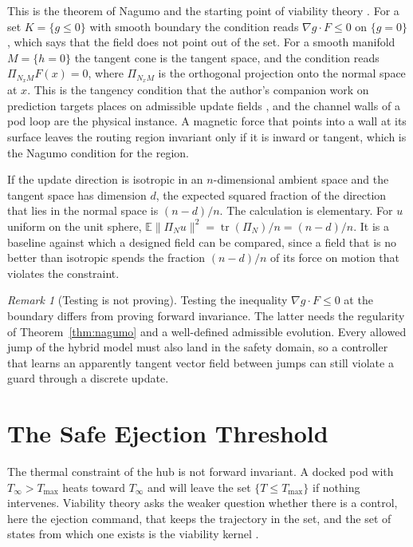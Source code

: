 \documentclass[11pt,openany]{book}
\theoremstyle{plain}
\theoremstyle{definition}
\theoremstyle{remark}
\newtheorem{remark}[theorem]{Remark}
\newcommand{\Tmax}{T_{\max}}
\begin{document}
This is the theorem of Nagumo and the starting point of viability theory \cite{nagumo,aubin}. For a set $K=\{g\le0\}$ with smooth boundary the condition reads $\nabla g\cdot F\le0$ on $\{g=0\}$, which says that the field does not point out of the set. For a smooth manifold $M=\{h=0\}$ the tangent cone is the tangent space, and the condition reads $\Pi_{N_xM}F(x)=0$, where $\Pi_{N_xM}$ is the orthogonal projection onto the normal space at $x$. This is the tangency condition that the author's companion work on prediction targets places on admissible update fields \cite{npn}, and the channel walls of a pod loop are the physical instance. A magnetic force that points into a wall at its surface leaves the routing region invariant only if it is inward or tangent, which is the Nagumo condition for the region.

If the update direction is isotropic in an $n$-dimensional ambient space and the tangent space has dimension $d$, the expected squared fraction of the direction that lies in the normal space is $(n-d)/n$. The calculation is elementary. For $u$ uniform on the unit sphere, $\mathbb E\|\Pi_Nu\|^2=\operatorname{tr}(\Pi_N)/n=(n-d)/n$. It is a baseline against which a designed field can be compared, since a field that is no better than isotropic spends the fraction $(n-d)/n$ of its force on motion that violates the constraint.

\begin{remark}[Testing is not proving]
Testing the inequality $\nabla g\cdot F\le0$ at the boundary differs from proving forward invariance. The latter needs the regularity of Theorem~\ref{thm:nagumo} and a well-defined admissible evolution. Every allowed jump of the hybrid model must also land in the safety domain, so a controller that learns an apparently tangent vector field between jumps can still violate a guard through a discrete update.
\end{remark}

\section{The Safe Ejection Threshold}

The thermal constraint of the hub is not forward invariant. A docked pod with $T_\infty>\Tmax$ heats toward $T_\infty$ and will leave the set $\{T\le\Tmax\}$ if nothing intervenes. Viability theory asks the weaker question whether there is a control, here the ejection command, that keeps the trajectory in the set, and the set of states from which one exists is the viability kernel \cite{aubin}.
\end{document}

